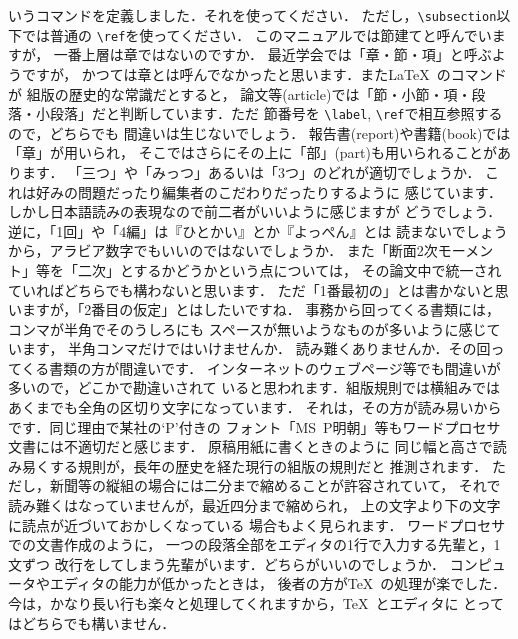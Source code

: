 \documentclass[onecolumn]{jsce}  %
\begin{document}
\begin{Enumerate}
いうコマンドを定義しました．それを使ってください．
ただし，\verb+\subsection+以下では普通の \verb+\ref+を使ってください．
%
\Qitem このマニュアルでは節建てと呼んでいますが，
一番上層は章ではないのですか．
\Aitem 最近学会では「章・節・項」と呼ぶようですが，
かつては章とは呼んでなかったと思います．また\LaTeX\ のコマンドが
組版の歴史的な常識だとすると，
論文等(article)では「節・小節・項・段落・小段落」だと判断しています．ただ
節番号を \verb+\label+, \verb+\ref+で相互参照するので，どちらでも
間違いは生じないでしょう．
報告書(report)や書籍(book)では「章」が用いられ，
そこではさらにその上に「部」(part)も用いられることがあります．
%
\Qitem 「三つ」や「みっつ」あるいは「3つ」のどれが適切でしょうか．
\Aitem これは好みの問題だったり編集者のこだわりだったりするように
感じています．しかし日本語読みの表現なので前二者がいいように感じますが
どうでしょう．
逆に，「1回」や「4編」は『ひとかい』とか『よっぺん』とは
読まないでしょうから，アラビア数字でもいいのではないでしょうか．
また「断面2次モーメント」等を「二次」とするかどうかという点については，
その論文中で統一されていればどちらでも構わないと思います．
ただ「1番最初の」とは書かないと思いますが，「2番目の仮定」とはしたいですね．
%
\Qitem 事務から回ってくる書類には，コンマが半角でそのうしろにも
スペースが無いようなものが多いように感じています，
半角コンマだけではいけませんか．
\Aitem 読み難くありませんか．その回ってくる書類の方が間違いです．
インターネットのウェブページ等でも間違いが多いので，どこかで勘違いされて
いると思われます．組版規則では横組みでは
あくまでも全角の区切り文字になっています．
それは，その方が読み易いからです．同じ理由で某社の`P'付きの
フォント「MS~P\mbox{}明朝」等もワードプロセサ文書には不適切だと感じます．
原稿用紙に書くときのように
同じ幅と高さで読み易くする規則が，長年の歴史を経た現行の組版の規則だと
推測されます．
ただし，新聞等の縦組の場合には二分まで縮めることが許容されていて，
それで読み難くはなっていませんが，最近四分まで縮められ，
上の文字より下の文字に読点が近づいておかしくなっている
場合もよく見られます．
%
\Qitem ワードプロセサでの文書作成のように，
一つの段落全部をエディタの1行で入力する先輩と，1文ずつ
改行をしてしまう先輩がいます．どちらがいいのでしょうか．
\Aitem コンピュータやエディタの能力が低かったときは，
後者の方が\TeX\ の処理が楽でした．
今は，かなり長い行も楽々と処理してくれますから，\TeX\ とエディタに
とってはどちらでも構いません．


\end{Enumerate}
\end{document}
